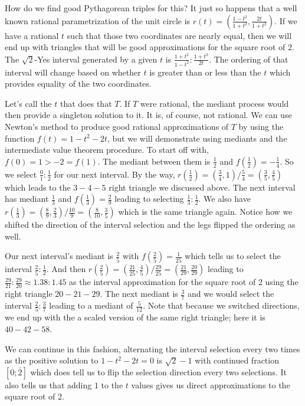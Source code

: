 \documentclass[12pt]{article}
\begin{document}
How do we find good Pythagorean triples for this? It just so happens that a well known rational parametrization of the unit circle is  $r(t) = (\frac{1-t^2}{1+t^2}, \frac{2t}{1+t^2})$.  If we have a rational $t$ such that those two coordinates are nearly equal, then we will end up with triangles that will be good approximations for the square root of 2. The $\sqrt{2}$-Yes interval generated by a given $t$ is $\frac{1+t^2}{1-t^2}:\frac{1+t^2}{2t}$. The ordering of that interval will change based on whether $t$ is greater than or less than the $t$ which provides equality of the two coordinates. 

Let's call the $t$ that does that $T$. If $T$ were rational, the mediant process would then provide a singleton solution to it. It is, of course, not rational. We can use Newton's method to produce good rational approximations of $T$ by using the function $f(t) = 1-t^2 - 2t$, but we will demonstrate using mediants and the intermediate value theorem procedure. To start off with, $f(0) = 1 > -2 = f(1)$. The mediant between them is $\frac{1}{2}$ and $f(\frac{1}{2}) = -\frac{1}{4}$. So we select $\frac{0}{1}:\frac{1}{2}$ for our next interval. By the way, $r(\frac{1}{2}) = (\frac{3}{4}, 1) / \frac{5}{4} = (\frac{3}{5}, \frac{4}{5})$ which leads to the $3-4-5$ right triangle we discussed above.  The next interval has mediant $\frac{1}{3}$ and $f(\frac{1}{3}) = \frac{2}{9}$ leading to selecting $\frac{1}{3}:\frac{1}{2}$. We also have $r(\frac{1}{3}) = ( \frac{8}{9}, \frac{2}{3}) / \frac{10}{9} = (\frac{8}{10}, \frac{3}{5})$ which is the same triangle again. Notice how we shifted the direction of the interval selection and the legs flipped the ordering as well.

Our next interval's mediant is $\frac{2}{5}$ with $f(\frac{2}{5}) = \frac{1}{25}$ which tells us to select the interval $\frac{2}{5}:\frac{1}{2}$. And then $r(\frac{2}{5}) = (\frac{21}{25}, \frac{4}{5})/\frac{29}{25} = (\frac{21}{29}, \frac{20}{29})$ leading to $\frac{29}{21}:\frac{29}{20} \approx 1.38: 1.45$ as the interval approximation for the square root of 2 using the right triangle $20-21-29$. The next mediant is $\frac{3}{7}$ and we would select the interval $\frac{2}{5}:\frac{3}{7}$ leading to a mediant of $\frac{5}{12}$.  Note that because we switched directions, we end up with the a scaled version of the same right triangle; here it is $40-42-58$. 

We can continue in this fashion, alternating the interval selection every two times as the positive solution to $1 - t^2 - 2t = 0$ is $\sqrt{2}-1$ with continued fraction $[0;\bar{2}]$ which does tell us to flip the selection direction every two selections. It also tells us that adding $1$ to the $t$ values gives us direct approximations to the square root of 2. 
\end{document}
